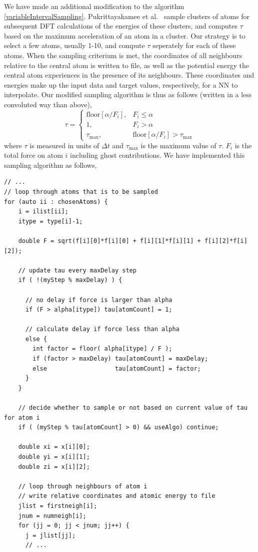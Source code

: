 \documentclass[twoside,english]{uiofysmaster}
\begin{document}
We have made an additional modification to the algorithm \eqref{variableIntervalSampling}.  
Pukrittayakamee et al.\ \cite{Pukrittayakamee09} sample clusters of atoms for subsequent DFT calculations
of the energies of these clusters, and computes $\tau$ based on the maximum acceleration of an atom in a cluster. 
Our strategy is to select a few atoms, usually 1-10, and compute $\tau$ seperately for each of these atoms. When 
the sampling criterium is met, the coordinates of all neighbours relative to the central atom is written to file, 
as well as the potential energy the central atom experiences in the presence of its neighbours. These coordinates
and energies make up the input data and target values, respectively, for a NN to interpolate. 
Our modified sampling algorithm is thus as follows (written in a less convoluted way than above),
\begin{equation}
 \tau = 
\begin{cases}
  \textrm{floor}\left[\alpha/F_i\right], &F_i \leq \alpha \\
  1, &F_i > \alpha \\
  \tau_\textrm{max}, &\textrm{floor}\left[\alpha/F_i\right] > \tau_\textrm{max}
\end{cases}
\label{samplingAlgorithmModified}
\end{equation}
where $\tau$ is measured in units of $\Delta t$ and $\tau_\textrm{max}$ is the maximum value of $\tau$.
$F_i$ is the total force on atom $i$ including ghost contributions. 
We have implemented this sampling algorithm as follows,
\begin{verbatim}
// ...
// loop through atoms that is to be sampled
for (auto ii : chosenAtoms) {
    i = ilist[ii];
    itype = type[i]-1;

    double F = sqrt(f[i][0]*f[i][0] + f[i][1]*f[i][1] + f[i][2]*f[i][2]);

    // update tau every maxDelay step
    if ( !(myStep % maxDelay) ) {

      // no delay if force is larger than alpha
      if (F > alpha[itype]) tau[atomCount] = 1;

      // calculate delay if force less than alpha
      else {
        int factor = floor( alpha[itype] / F );
        if (factor > maxDelay) tau[atomCount] = maxDelay;
        else                   tau[atomCount] = factor;
      }
    }

    // decide whether to sample or not based on current value of tau for atom i
    if ( (myStep % tau[atomCount] > 0) && useAlgo) continue;

    double xi = x[i][0];
    double yi = x[i][1];
    double zi = x[i][2];
    
    // loop through neighbours of atom i 
    // write relative coordinates and atomic energy to file
    jlist = firstneigh[i];
    jnum = numneigh[i];
    for (jj = 0; jj < jnum; jj++) {
      j = jlist[jj];
      // ...
\end{verbatim}
\end{document}
